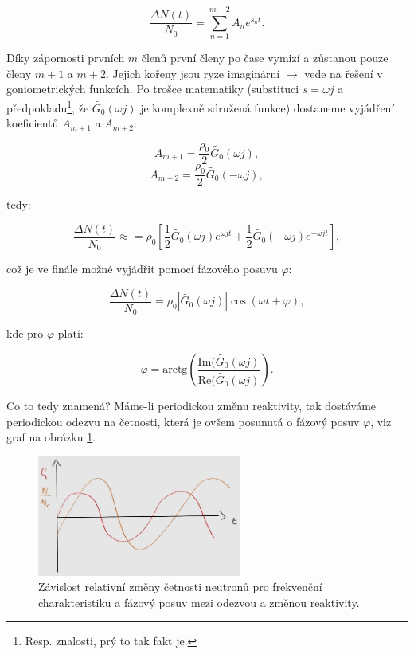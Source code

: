 $$ \dfrac{\Delta N(t)}{N_0} = \sum_{n = 1}^{m+2} A_n e^{s_n t}. $$

Díky zápornosti prvních $m$ členů první členy po čase vymizí a zůstanou pouze členy $m+1$ a $m+2$. Jejich kořeny jsou ryze imaginární $\rightarrow$ vede na řešení v goniometrických funkcích. Po trošce matematiky (substituci $s = \omega j$ a předpokladu\footnote{Resp. znalosti, prý to tak fakt je.}, že $\tilde{G_0}(\omega j)$ je komplexně sdružená funkce) dostaneme vyjádření koeficientů $A_{m+1}$ a $A_{m+2}$:

$$ A_{m+1} = \dfrac{\rho_0}{2} \tilde{G_0}(\omega j), $$
$$ A_{m+2} = \dfrac{\rho_0}{2} \tilde{G_0}(-\omega j), $$

tedy:

$$ \dfrac{\Delta N(t)}{N_0} \approx = \rho_0 \left [\dfrac{1}{2} \tilde{G_0}(\omega j) e^{\omega j t} + \dfrac{1}{2} \tilde{G_0}(-\omega j) e^{-\omega j t} \right ], $$

což je ve finále možné vyjádřit pomocí fázového posuvu $\varphi$:

\begin{equation}
  \boxed{
  \dfrac{\Delta N(t)}{N_0} = \rho_0 | \tilde{G_0}(\omega j) | \cos (\omega t + \varphi),
  \label{frekvencni_charakteristika_reseni}}
\end{equation}

kde pro $\varphi$ platí:

\begin{equation}
  \boxed{
  \varphi = \text{arctg} \left ( \dfrac{\text{Im} (\tilde{G_0}(\omega j)}{\text{Re}(\tilde{G_0}(\omega j)} \right ).
  \label{frekvencni_charakteristika_faze}}
\end{equation}

Co to tedy znamená? Máme-li periodickou změnu reaktivity, tak dostáváme periodickou odezvu na četnosti, která je ovšem posunutá o fázový posuv $\varphi$, viz graf na obrázku \ref{fig_frekvencni}.\\

\begin{figure}[H]
 \centering
 \includegraphics[width=0.6\textwidth]{img/frekvencni.jpg}
 \caption{Závislost relativní změny četnosti neutronů pro frekvenční charakteristiku a fázový posuv mezi odezvou a změnou reaktivity.}
 \label{fig_frekvencni}
\end{figure}

